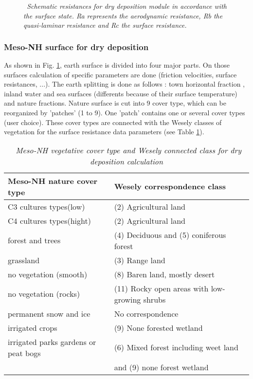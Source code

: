 \begin{figure}[htb]
\centerline{}
\caption{\sl ~{Schematic resistances for dry deposition module in
accordance with the surface state. 
Ra represents the aerodynamic resistance, Rb the quasi-laminar
resistance and Rc the surface resistance.}}
\label{schema} 
\end{figure}
\subsubsection*{Meso-NH surface for dry deposition}
As shown in Fig. \ref{schema}, earth surface is divided into four major
parts. On those surfaces calculation of specific parameters are done
(friction velocities, surface resistances, ...). The earth splitting
is done as follows : town horizontal fraction \citep{Masson2000}, inland
water and sea surfaces (differents because of their surface
temperature) and nature fractions. Nature surface is cut into 9 cover type, 
which can be reorganized by 'patches' (1 to 9). 
One 'patch' contains one or several cover types (user choice). 
These cover types are connected with the Wesely classes of
vegetation for the surface resistance data parameters (see Table
\ref{classveg}).
\begin{table}
\begin{center}
\begin{tabular}{|l|l|} \hline
\bf{Meso-NH nature cover type} & \bf{Wesely correspondence class} \\ \hline 
 C3 cultures types(low) &       (2) Agricultural land \\ 
 C4 cultures types(hight)&      (2) Agricultural land \\ 
 forest and trees       &       (4) Deciduous and (5) coniferous
 forest \\ 
 grassland              &       (3) Range land \\ 
 no vegetation (smooth) &       (8) Baren land, mostly desert \\  
 no vegetation (rocks)  &       (11) Rocky open areas with low-growing
 shrubs \\ 
 permanent snow and ice &        No correspondence \\ 
 irrigated crops        &       (9) None forested wetland \\ 
 irrigated parks gardens or peat bogs   & (6) Mixed forest including
 weet land\\
                        &                  and (9) none forest wetland \\ 
\hline
\end{tabular}
\caption{\sl ~{Meso-NH vegetative cover type and Wesely connected
class for dry deposition calculation}}
\label{classveg}
\end{center}
\end{table}

